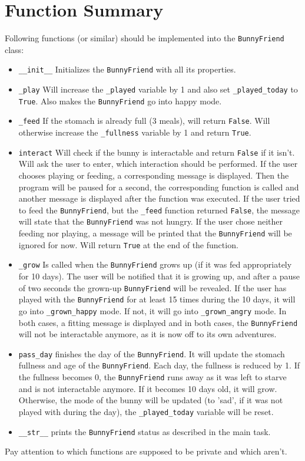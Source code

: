\section{Function Summary}
\noindent Following functions (or similar) should be implemented into the \texttt{BunnyFriend} class:
\begin{itemize}
	\item \texttt{\_\_init\_\_} Initializes the \texttt{BunnyFriend} with all its properties.
	\item \texttt{\_play} Will increase the \texttt{\_played} variable by 1 and also set
	\texttt{\_played\_today} to \texttt{True}. Also makes the \texttt{BunnyFriend} go into happy mode.
	\item \texttt{\_feed} If the stomach is already full (3 meals), will return \texttt{False}.
	Will otherwise increase the \texttt{\_fullness} variable by 1 and return \texttt{True}.
	\item \texttt{interact} Will check if the bunny is interactable and return \texttt{False} if it
	isn't.
	Will ask the user to enter, which interaction should be
	performed. If the user chooses playing or feeding, a corresponding message is displayed.
	Then the program will be paused for a second, the corresponding function is called and
	another message is displayed after the function was executed. If the
	user tried to feed the \texttt{BunnyFriend}, but the \texttt{\_feed} function returned \texttt{False}, the
	message will state that the \texttt{BunnyFriend} was not hungry. If the user chose neither
	feeding nor playing, a message will be printed that the \texttt{BunnyFriend} will be ignored for now.
	Will return \texttt{True} at the end of the function.
	\item \texttt{\_grow} Is called when the \texttt{BunnyFriend} grows up (if it was fed appropriately
	for 10 days). The user will be notified that it is growing up, and after a pause of two seconds
	the grown-up \texttt{BunnyFriend} will be revealed. If the user has played with the \texttt{BunnyFriend} for at
	least 15 times during the 10 days, it will go into \texttt{\_grown\_happy} mode. If not,
	it will go into \texttt{\_grown\_angry} mode. In both cases, a fitting message is displayed and
	in both cases, the \texttt{BunnyFriend} will not be interactable anymore, as it is now off to its own
	adventures.
	\item \texttt{pass\_day} finishes the day of the \texttt{BunnyFriend}. It will update the stomach fullness
	and age of the \texttt{BunnyFriend}. Each day, the fullness is reduced by 1. If the fullness becomes 0,
	the \texttt{BunnyFriend} runs away as it was left to starve and is not interactable anymore. If it becomes
	10 days old, it will grow. Otherwise, the mode of the bunny will be updated (to 'sad', if  it
	was not played with during the day), the \texttt{\_played\_today} variable will be reset.
	\item \texttt{\_\_str\_\_} prints the \texttt{BunnyFriend} status as described in the main task.
\end{itemize}
Pay attention to which functions are supposed to be private and which aren't.


